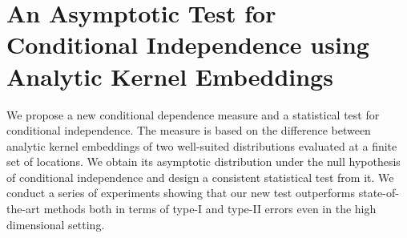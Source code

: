 \chapter{An Asymptotic Test for Conditional Independence using Analytic Kernel Embeddings}
\label{paper:kerneltest}
We propose a new conditional dependence measure and a statistical test for conditional independence. The measure is based on the difference between analytic kernel embeddings of two well-suited distributions evaluated at a finite set of locations. We obtain its asymptotic distribution under the null hypothesis of conditional independence and design a consistent statistical test from it. We conduct a series of experiments showing that our new test outperforms state-of-the-art methods both in terms of type-I and type-II errors even in the high dimensional setting.


%



 



